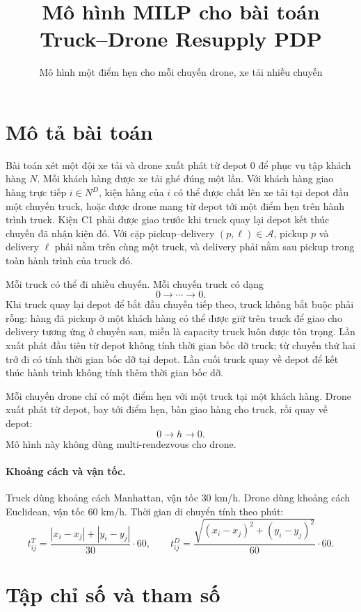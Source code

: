 \documentclass[12pt,a4paper]{article}
\title{Mô hình MILP cho bài toán Truck--Drone Resupply PDP}
\author{Mô hình một điểm hẹn cho mỗi chuyến drone, xe tải nhiều chuyến}
\date{}
\begin{document}
\maketitle

\section{Mô tả bài toán}

Bài toán xét một đội xe tải và drone xuất phát từ depot \(0\) để phục vụ tập khách
hàng \(N\). Mỗi khách hàng được xe tải ghé đúng một lần. Với khách hàng giao hàng
trực tiếp \(i\in N^D\), kiện hàng của \(i\) có thể được chất lên xe tải tại depot
đầu một chuyến truck, hoặc được drone mang từ depot tới một điểm hẹn trên hành trình
truck. Kiện C1 phải được giao trước khi truck quay lại depot kết thúc chuyến đã nhận
kiện đó. Với cặp pickup--delivery \((p,\ell)\in\mathcal A\), pickup \(p\) và delivery
\(\ell\) phải nằm trên cùng một truck, và delivery phải nằm sau pickup trong toàn
hành trình của truck đó.

Mỗi truck có thể đi nhiều chuyến. Mỗi chuyến truck có dạng
\[
  0 \rightarrow \cdots \rightarrow 0.
\]
Khi truck quay lại depot để bắt đầu chuyến tiếp theo, truck không bắt buộc phải rỗng:
hàng đã pickup ở một khách hàng có thể được giữ trên truck để giao cho delivery tương
ứng ở chuyến sau, miễn là capacity truck luôn được tôn trọng. Lần xuất phát đầu tiên
từ depot không tính thời gian bốc dỡ truck; từ chuyến thứ hai trở đi có tính thời gian
bốc dỡ tại depot. Lần cuối truck quay về depot để kết thúc hành trình không tính thêm
thời gian bốc dỡ.

Mỗi chuyến drone chỉ có một điểm hẹn với một truck tại một khách hàng. Drone xuất
phát từ depot, bay tới điểm hẹn, bàn giao hàng cho truck, rồi quay về depot:
\[
  0 \rightarrow h \rightarrow 0.
\]
Mô hình này không dùng multi-rendezvous cho drone.

\paragraph{Khoảng cách và vận tốc.}
Truck dùng khoảng cách Manhattan, vận tốc \(30\) km/h. Drone dùng khoảng cách
Euclidean, vận tốc \(60\) km/h. Thời gian di chuyển tính theo phút:
\[
  t^T_{ij}=\frac{|x_i-x_j|+|y_i-y_j|}{30}\cdot 60,\qquad
  t^D_{ij}=\frac{\sqrt{(x_i-x_j)^2+(y_i-y_j)^2}}{60}\cdot 60.
\]

\section{Tập chỉ số và tham số}
\end{document}
